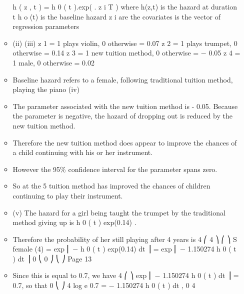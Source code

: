 \documentclass[a4paper,12pt]{article}
\begin{document}
\begin{enumerate}
\begin{itemize}
h ( z , t ) = h 0 ( t ).exp( \beta . z i T )
where h(z,t) is the hazard at duration t
h o (t) is the baseline hazard
z i are the covariates
\beta is the vector of regression parameters
\item (ii)
(iii)
z 1 = 1 plays violin, 0 otherwise  = 0.07
z 2 = 1 plays trumpet, 0 otherwise  = 0.14
z 3 = 1 new tuition method, 0 otherwise  = − 0.05
z 4 = 1 male, 0 otherwise  = 0.02
\item Baseline hazard refers to
a female,
following traditional tuition method,
playing the piano
(iv)
\item The parameter associated with the new tuition
method is - 0.05. Because the parameter is negative, the hazard of dropping
out is reduced by the new tuition method.
\item Therefore the new tuition method does appear
to improve the chances of a child continuing
with his or her instrument.
\item However the 95\% confidence interval for the parameter spans zero.
\item So at the 5%
tuition method has improved the chances of children continuing to play their
instrument.
\item (v)
The hazard for a girl being taught the trumpet by the traditional
method giving up is h 0 ( t ) exp(0.14) .
\item Therefore the probability of her still playing after 4 years is
4
⎛ 4
⎞
⎛
⎞
S female (4) = exp ⎜ − \int h 0 ( t ) exp(0.14) dt ⎟ = exp ⎜ − 1.150274 \int h 0 ( t ) dt ⎟
0
⎝ 0
⎠
⎝
⎠
Page 13%
\item Since this is equal to 0.7, we have
4
⎛
⎞
exp ⎜ − 1.150274 \int h 0 ( t ) dt ⎟ = 0.7, so that
0
⎝
⎠
4
log e 0.7 = − 1.150274 \int h 0 ( t ) dt ,
0
4
\end{itemize}


\end{enumerate}
\end{document}
